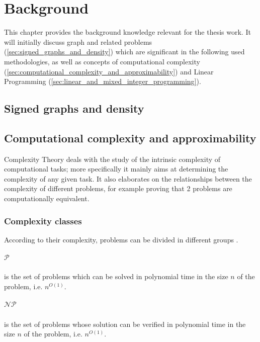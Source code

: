 \chapter{Background}
\label{ch:background}

This chapter provides the background knowledge relevant for the thesis work. It
will initially discuss graph and related problems (\autoref{sec:signed_graphs_and_density}) which are significant in the
following used methodologies, as well as concepts of computational complexity
(\autoref{sec:computational_complexity_and_approximability}) and Linear
Programming (\autoref{sec:linear_and_mixed_integer_programming}).

\section{Signed graphs and density}%
\label{sec:signed_graphs_and_density}

\section{Computational complexity and approximability}%
\label{sec:computational_complexity_and_approximability}

Complexity Theory deals with the study of the intrinsic complexity of
computational tasks; more specifically it mainly aims at
determining the complexity of any given task. It also elaborates on the
relationships between the complexity of different problems, for example proving
that 2 problems are computationally equivalent\cite{9780521884730}.

\subsection{Complexity classes}%
\label{par:complexity_classes}

According to their complexity, problems can be divided in different groups
\cite{DemaineFall2014}.

\paragraph{$\mathcal{P} $}%
\label{par:p}
is the set of problems which can be solved in polynomial time in the size $n$ of
the problem, i.e. $n^{O(1)} $.

\paragraph{$\mathcal{NP} $}%
\label{par:np} is the set of problems whose solution can be verified in polynomial time in the size $n$ of the problem, i.e. $n^{O(1)} $.

